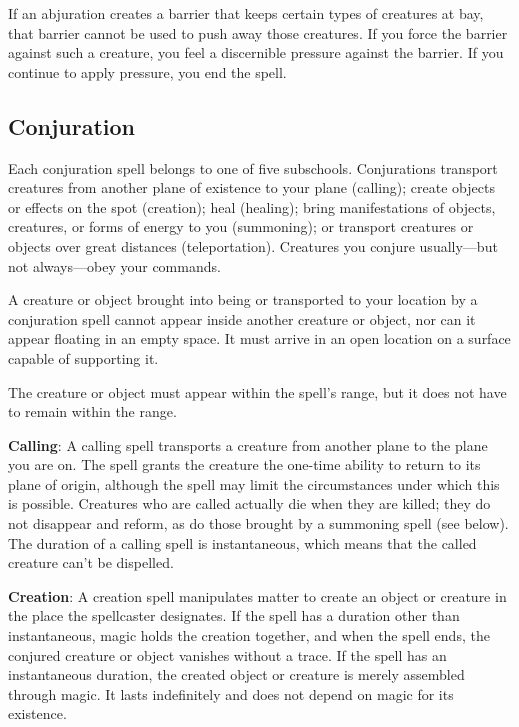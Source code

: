 If an abjuration creates a barrier that keeps certain types of creatures at bay, that barrier cannot be used to push away those creatures. If you force the barrier against such a creature, you feel a discernible pressure against the barrier. If you continue to apply pressure, you end the spell.
				
\subsection{Conjuration}

				
Each conjuration spell belongs to one of five subschools. Conjurations transport creatures from another plane of existence to your plane (calling); create objects or effects on the spot (creation); heal (healing); bring manifestations of objects, creatures, or forms of energy to you (summoning); or transport creatures or objects over great distances (teleportation). Creatures you conjure usually---but not always---obey your commands.
				
A creature or object brought into being or transported to your location by a conjuration spell cannot appear inside another creature or object, nor can it appear floating in an empty space. It must arrive in an open location on a surface capable of supporting it.
				
The creature or object must appear within the spell's range, but it does not have to remain within the range.
				
\textbf{Calling}: A calling spell transports a creature from another plane to the plane you are on. The spell grants the creature the one-time ability to return to its plane of origin, although the spell may limit the circumstances under which this is possible. Creatures who are called actually die when they are killed; they do not disappear and reform, as do those brought by a summoning spell (see below). The duration of a calling spell is instantaneous, which means that the called creature can't be dispelled.
				
\textbf{Creation}: A creation spell manipulates matter to create an object or creature in the place the spellcaster designates. If the spell has a duration other than instantaneous, magic holds the creation together, and when the spell ends, the conjured creature or object vanishes without a trace. If the spell has an instantaneous duration, the created object or creature is merely assembled through magic. It lasts indefinitely and does not depend on magic for its existence.
				
